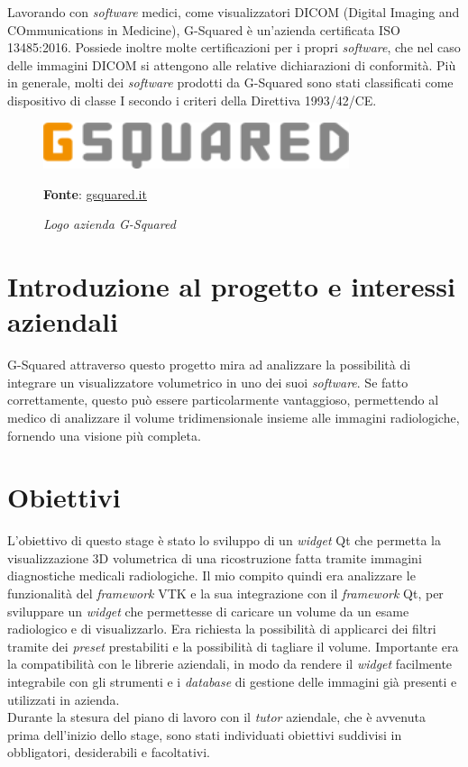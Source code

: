 Lavorando con \emph{software} medici, come visualizzatori DICOM (Digital Imaging and COmmunications in Medicine), G-Squared è un'azienda certificata ISO 13485:2016. Possiede inoltre molte certificazioni per i propri \emph{software}, che nel caso delle immagini DICOM si attengono alle relative dichiarazioni di conformità. Più in generale, molti dei \emph{software} prodotti da G-Squared sono stati classificati come dispositivo di classe I secondo i criteri della Direttiva 1993/42/CE.

\begin{figure}[ht]
    \centering
    \includegraphics[width=0.8\textwidth]{immagini/logo-azienda.png}
    \caption{\textit{Logo azienda G-Squared}}
    \textbf{Fonte}: \href{https://www.gsquared.it/it}{gsquared.it}
    \label{fig: Logo azienda G-Squared}
\end{figure}

\section{Introduzione al progetto e interessi aziendali}
G-Squared attraverso questo progetto mira ad analizzare la possibilità di integrare un visualizzatore volumetrico in uno dei suoi \emph{software}. Se fatto correttamente, questo può essere particolarmente vantaggioso, permettendo al medico di analizzare il volume tridimensionale insieme alle immagini radiologiche, fornendo una visione più completa.

\section{Obiettivi}\label{sec:descrizione-obiettivi}
L'obiettivo di questo stage è stato lo sviluppo di un \emph{widget} Qt che permetta la visualizzazione 3D volumetrica di una ricostruzione fatta tramite immagini diagnostiche medicali radiologiche. Il mio compito quindi era analizzare le funzionalità del \emph{framework} VTK e la sua integrazione con il \emph{framework} Qt, per sviluppare un \emph{widget} che permettesse di caricare un volume da un esame radiologico e di visualizzarlo. Era richiesta la possibilità di applicarci dei filtri tramite dei \emph{preset} prestabiliti e la possibilità di tagliare il volume.
Importante era la compatibilità con le librerie aziendali, in modo da rendere il \emph{widget} facilmente integrabile con gli strumenti e i \emph{database} di gestione delle immagini già presenti e utilizzati in azienda.
\\
Durante la stesura del piano di lavoro con il \emph{tutor} aziendale, che è avvenuta prima dell'inizio dello stage, sono stati individuati obiettivi suddivisi in obbligatori, desiderabili e facoltativi.

